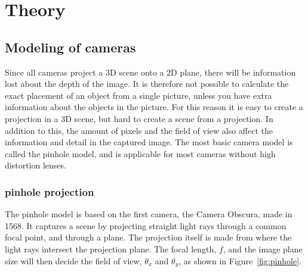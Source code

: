 
\chapter{Theory}
\section{Modeling of cameras}

Since all cameras project a 3D scene onto a 2D plane, there will be information lost about the depth of the image. It is therefore not possible to calculate the exact placement of an object from a single picture, unless you have extra information about the objects in the picture. For this reason it is easy to create a projection in a 3D scene, but hard to create a scene from a projection. In addition to this, the amount of pixels and the field of view also affect the information and detail in the captured image. The most basic camera model is called the pinhole model, and is applicable for most cameras without high distortion lenses.

\subsection{pinhole projection} \label{sec:pinhole}
The pinhole model is based on the first camera, the Camera Obscura, made in 1568. It captures a scene by projecting straight light rays through a common focal point, and through a plane. The projection itself is made from where the light rays intersect the projection plane. The focal length, $f$, and the image plane size will then decide the field of view, $\theta_x$ and $\theta_y$, as shown in Figure~\ref{fig:pinhole}. 


